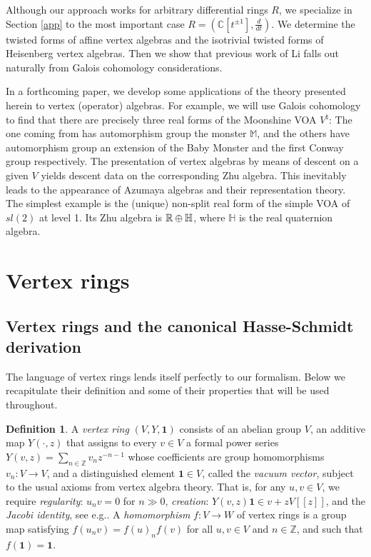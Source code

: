 \documentclass{article}
\theoremstyle{definition}
\newtheorem{de}[thm]{Definition}
\begin{document}
Although our approach works for arbitrary differential rings $R$, we specialize in Section \ref{app} to the most important case $R = (\mathbb C[t^{\pm 1}], \frac{d}{dt})$.  We determine the twisted forms  of affine vertex algebras and the isotrivial twisted forms of Heisenberg vertex algebras. Then we show that previous work \cite{Li1} of Li falls out naturally from Galois cohomology considerations.
 

In a forthcoming paper, we develop some applications of  the theory presented herein to vertex (operator) algebras. For example, we will  use Galois cohomology to find that there are precisely three real forms of the Moonshine VOA $V^\natural$: The one coming from \cite{FLM} has automorphism group the monster $\mathbb{M}$,  and the others have automorphism group an extension of the Baby Monster and the first Conway group respectively.  
The presentation of vertex algebras by means of descent on a given $V$ yields descent data on the corresponding Zhu algebra. This inevitably leads to the appearance of Azumaya algebras and their representation theory. The simplest example is the (unique) non-split  real form of the simple VOA of $sl(2)$ at level 1. Its Zhu algebra is $\mathbb{R} \oplus \Bbb{H}$, where $\mathbb H$ is the real quaternion algebra.
 
\bigskip
\section{Vertex rings}

\subsection{Vertex rings and  the canonical Hasse-Schmidt derivation}
The language of vertex rings \cite{Mason} lends itself perfectly to our formalism.
Below we recapitulate their definition and some of their properties that will be used throughout.

\begin{de}
	A \emph{vertex ring} $(V,Y,\mathbf 1)$ consists of an abelian group $V$, an additive map $Y(\cdot, z)$ that assigns to every $v \in V$ a formal power series $Y(v,z) = \sum_{n \in \mathbb Z} v_n z^{-n-1}$ whose coefficients are group homomorphisms $v_n \colon V \to V$, and a distinguished element $\mathbf 1 \in V$, called the \emph{vacuum vector}, subject to the usual axioms from vertex algebra theory.
	That is, for any $u, v \in V$, we require 	
	\textit{regularity}: $u_n v = 0$ for $n \gg 0$,
	\textit{creation}: $Y(v, z) \mathbf 1 \in v + z V[[z]]$, and
	the \textit{Jacobi identity}, see e.g.\@ \cite[Sec.\ 3.1]{LL}.
A \emph{homomorphism} $f \colon V \to W$ of vertex rings is a group map satisfying $f(u_n v) = f(u)_n f(v)$ for all $u,v \in V$ and $n \in \mathbb Z$, and such that $f(\mathbf 1) = \mathbf 1$.
\end{de}
\end{document}
